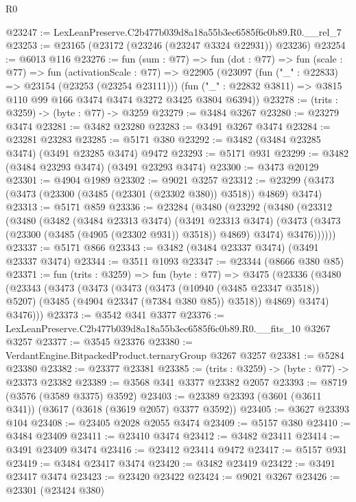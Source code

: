\begin{lexlean}{R0}
\begin{coremodule}
@23247 := LexLeanPreserve.C2b477b039d8a18a55b3ec6585f6c0b89.R0.__rel_7
@23253 := @23165 (@23172 (@23246 (@23247 @3324 @22931)) @23236)
@23254 := @6013 @116
@23276 := fun (sum : @77) =>
  fun (dot : @77) =>
  fun (scale : @77) =>
  fun (activationScale : @77) =>
  @22905
    (@23097
      (fun ("_" : @22833) => @23154 (@23253 (@23254 @23111)))
      (fun ("_" : @22832 @3811) => @3815 @110 @99 @166 @3474 @3474 @3272 @3425 @3804 @6394))
@23278 := (trits : @3259) -> (byte : @77) -> @3259
@23279 := @3484 @3267
@23280 := @23279 @3474
@23281 := @3482 @23280
@23283 := @3491 @3267 @3474
@23284 := @23281 @23283
@23285 := @5171 @380
@23292 := @3482 (@3484 @23285 @3474) (@3491 @23285 @3474) @9472
@23293 := @5171 @931
@23299 := @3482 (@3484 @23293 @3474) (@3491 @23293 @3474)
@23300 := @3473 @20129
@23301 := @4904 @1989
@23302 := @9021 @3257
@23312 := @23299 (@3473 (@3473 (@23300 (@3485 (@23301 (@23302 @380)) @3518)) @4869) @3474)
@23313 := @5171 @859
@23336 := @23284
    (@3480
      (@23292
        (@3480
          (@23312
            (@3480
              (@3482
                (@3484 @23313 @3474)
                (@3491 @23313 @3474)
                (@3473 (@3473 (@23300 (@3485 (@4905 (@23302 @931)) @3518)) @4869) @3474)
                @3476))))))
@23337 := @5171 @866
@23343 := @3482 (@3484 @23337 @3474) (@3491 @23337 @3474)
@23344 := @3511 @1093
@23347 := @23344 (@8666 @380 @85)
@23371 := fun (trits : @3259) =>
  fun (byte : @77) =>
  @3475
    (@23336
      (@3480
        (@23343
          (@3473
            (@3473
              (@3473
                (@3473 (@10940 (@3485 @23347 @3518)) @5207)
                (@3485 (@4904 @23347 (@7384 @380 @85)) @3518))
              @4869)
            @3474)
          @3476)))
@23373 := @3542 @341 @3377
@23376 := LexLeanPreserve.C2b477b039d8a18a55b3ec6585f6c0b89.R0.__fits_10 @3267 @3257
@23377 := @3545 @23376
@23380 := VerdantEngine.BitpackedProduct.ternaryGroup @3267 @3257
@23381 := @5284 @23380
@23382 := @23377 @23381
@23385 := (trits : @3259) -> (byte : @77) -> @23373 @23382
@23389 := @3568 @341 @3377 @23382 @2057
@23393 := @8719 (@3576 (@3589 @3375) @3592)
@23403 := @23389 @23393 (@3601 (@3611 @341)) (@3617 (@3618 (@3619 @2057) @3377 @3592))
@23405 := @3627 @23393 @104
@23408 := @23405 @2028 @2055 @3474
@23409 := @5157 @380
@23410 := @3484 @23409
@23411 := @23410 @3474
@23412 := @3482 @23411
@23414 := @3491 @23409 @3474
@23416 := @23412 @23414 @9472
@23417 := @5157 @931
@23419 := @3484 @23417 @3474
@23420 := @3482 @23419
@23422 := @3491 @23417 @3474
@23423 := @23420 @23422
@23424 := @9021 @3267
@23426 := @23301 (@23424 @380)

\end{coremodule}
\end{lexlean}

